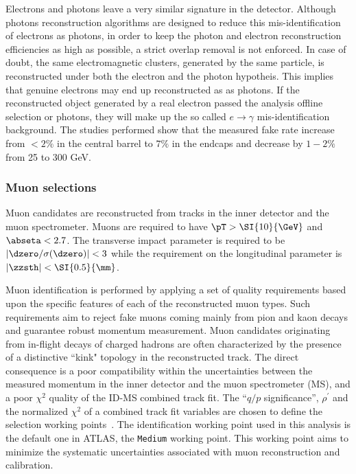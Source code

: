 Electrons and photons leave a very similar signature in the detector. Although photons reconstruction
algorithms are designed to reduce this mis-identification of electrons as photons, in order to keep the
photon and electron reconstruction efficiencies as high as possible, a strict overlap removal is not enforced.
In case of doubt, the same electromagnetic clusters, generated by the same particle, is reconstructed under
both the electron and the photon hypotheis. This implies that genuine electrons may end up reconstructed
as as photons. If the reconstructed object generated by a real electron passed the analysis offline selection
or photons, they will make up the so called $e\to\gamma$ mis-identification background. The studies performed
show that the measured fake rate increase from $<2\% $ in the central barrel to $7\%$ in the endcaps and decrease
by $1-2\% $ from 25 to 300 GeV.

\subsubsection{Muon selections}
Muon candidates are reconstructed from tracks in the inner detector and the muon spectrometer. Muons are required to have $\pT>\SI{10}{\GeV}$ and $\abseta<2.7$. The transverse impact parameter is required to be  $\left|\dzero/\sigma(\dzero)\right|<3$ while the requirement on the longitudinal parameter is $\left|\zzsth\right|<\SI{0.5}{\mm}$.

Muon identification is performed by applying a set of quality requirements based upon the specific features of each of the reconstructed muon types. Such requirements aim to reject fake muons coming mainly from pion and kaon decays and guarantee robust momentum measurement. Muon candidates originating from in-flight decays of charged hadrons are often characterized by the presence of a distinctive ``kink" topology in the reconstructed track. The direct consequence is a poor compatibility within the uncertainties between the measured momentum in the inner detector and the muon spectrometer (MS), and a poor $\chi^2$ quality of the ID-MS combined track fit. The ``$q/p$ significance'', $\rho^{'}$ and the normalized $\chi^2$ of a combined track fit variables are chosen to define the selection working points~\cite{Bugge:2665711}. The identification working point used in this analysis is the default one in ATLAS, the \texttt{Medium} working point. This working point aims to minimize the systematic uncertainties associated with muon reconstruction and calibration.
 
